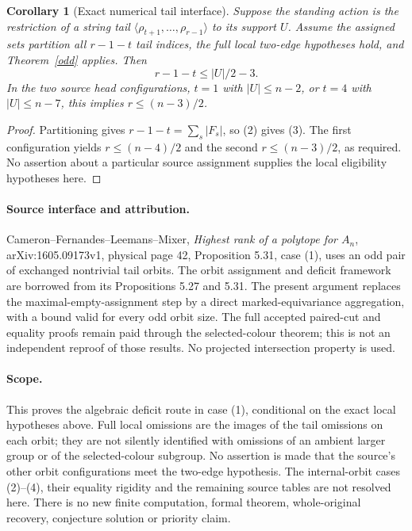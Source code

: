 \documentclass[11pt,a4paper]{article}
\newtheorem{corollary}[lemma]{Corollary}
\newcommand{\gen}[1]{\langle#1\rangle}
\begin{document}
\begin{corollary}[Exact numerical tail interface]\label{tail}
Suppose the standing action is the restriction of a string tail
$\gen{\rho_{t+1},\ldots,\rho_{r-1}}$ to its support $U$.
Assume the assigned sets partition all $r-1-t$ tail indices, the
full local two-edge hypotheses hold, and Theorem~\ref{odd} applies.
Then
\[
                       r-1-t\le |U|/2-3.             \tag{3}
\]
In the two source head configurations, $t=1$ with $|U|\le n-2$,
or $t=4$ with $|U|\le n-7$, this implies $r\le(n-3)/2$.
\end{corollary}
\begin{proof}
Partitioning gives $r-1-t=\sum_s|F_s|$, so (2) gives (3).
The first configuration yields $r\le(n-4)/2$ and the second
$r\le(n-3)/2$, as required. No assertion about a particular
source assignment supplies the local eligibility hypotheses here.
\end{proof}

\paragraph{Source interface and attribution.}
Cameron--Fernandes--Leemans--Mixer, \emph{Highest rank of a polytope
for $A_n$}, arXiv:1605.09173v1, physical page 42, Proposition 5.31,
case (1), uses an odd pair of exchanged nontrivial tail orbits.
The orbit assignment and deficit framework are borrowed from its
Propositions 5.27 and 5.31. The present argument replaces the
maximal-empty-assignment step by a direct marked-equivariance
aggregation, with a bound valid for every odd orbit size.
The full accepted paired-cut and equality proofs remain paid through
the selected-colour theorem; this is not an independent reproof of
those results. No projected intersection property is used.

\paragraph{Scope.}
This proves the algebraic deficit route in case (1), conditional on
the exact local hypotheses above. Full local omissions are the
images of the tail omissions on each orbit; they are not silently
identified with omissions of an ambient larger group or of the
selected-colour subgroup. No assertion is made that the source's
other orbit configurations meet the two-edge hypothesis. The
internal-orbit cases (2)--(4), their equality rigidity and the
remaining source tables are not resolved here. There is no new
finite computation, formal theorem, whole-original recovery,
conjecture solution or priority claim.
\end{document}

